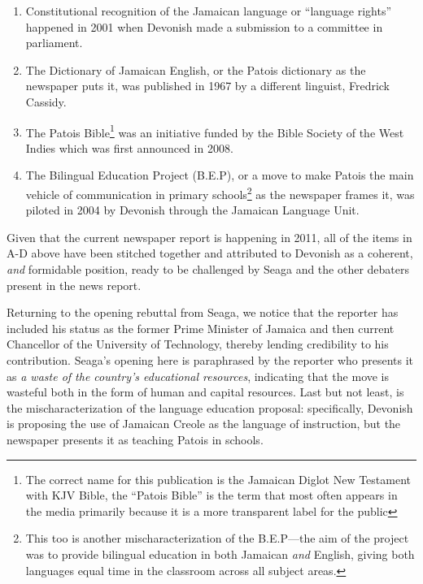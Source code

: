 \documentclass[output=paper,colorlinks,citecolor=brown]{langscibook}
\begin{document}
\begin{enumerate}[label=\Alph*.]
    \item Constitutional recognition of the Jamaican language or “language rights” happened in 2001 when Devonish made a submission to a committee in parliament.

    \item The Dictionary of Jamaican English, or the Patois dictionary as the newspaper puts it, was published in 1967 by a different linguist, Fredrick Cassidy. 

    \item The Patois Bible\footnote{The correct name for this publication is the Jamaican Diglot New Testament with KJV Bible, the “Patois Bible” is the term that most often appears in the media primarily because it is a more transparent label for the public \nocite{BSWI2012}} was an initiative funded by the Bible Society of the West Indies which was first announced in 2008.  

    \item The Bilingual Education Project (B.E.P), or a move to make Patois the main vehicle of communication in primary schools\footnote{This too is another mischaracterization of the B.E.P—the aim of the project was to provide bilingual education in both Jamaican \emph{and} English, giving both languages equal time in the classroom across all subject areas.} as the newspaper frames it, was piloted in 2004 by Devonish through the Jamaican Language Unit. 
\end{enumerate}

Given that the current newspaper report is happening in 2011, all of the items in A-D above have been stitched together and attributed to Devonish as a coherent, \emph{and} formidable position, ready to be challenged by Seaga and the other debaters present in the news report.

Returning to the opening rebuttal from Seaga, we notice that the reporter has included his status as the former Prime Minister of Jamaica and then current Chancellor of the University of Technology, thereby lending credibility to his contribution. Seaga’s opening here is paraphrased by the reporter who presents it as \emph{a waste of the country’s educational resources}, indicating that the move is wasteful both in the form of human and capital resources. Last but not least, is the mischaracterization of the language education proposal:  specifically, Devonish is proposing the use of Jamaican Creole as the language of instruction, but the newspaper presents it as teaching Patois in schools. 
\end{document}
